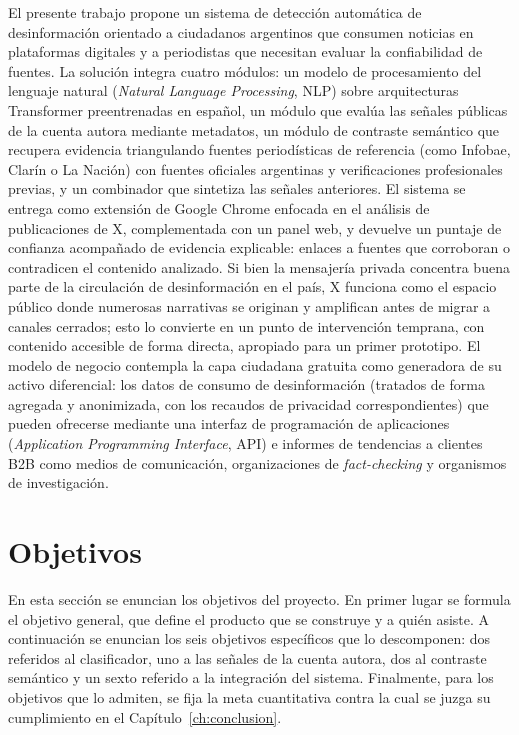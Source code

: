 El presente trabajo propone un sistema de detección automática de desinformación orientado a ciudadanos argentinos que consumen noticias en plataformas digitales y a periodistas que necesitan evaluar la confiabilidad de fuentes. La solución integra cuatro módulos: un modelo de procesamiento del lenguaje natural (\textit{Natural Language Processing}, NLP) sobre arquitecturas Transformer preentrenadas en español, un módulo que evalúa las señales públicas de la cuenta autora mediante metadatos, un módulo de contraste semántico que recupera evidencia triangulando fuentes periodísticas de referencia (como Infobae, Clarín o La Nación) con fuentes oficiales argentinas y verificaciones profesionales previas, y un combinador que sintetiza las señales anteriores. El sistema se entrega como extensión de Google Chrome enfocada en el análisis de publicaciones de X, complementada con un panel web, y devuelve un puntaje de confianza acompañado de evidencia explicable: enlaces a fuentes que corroboran o contradicen el contenido analizado. Si bien la mensajería privada concentra buena parte de la circulación de desinformación en el país, X funciona como el espacio público donde numerosas narrativas se originan y amplifican antes de migrar a canales cerrados; esto lo convierte en un punto de intervención temprana, con contenido accesible de forma directa, apropiado para un primer prototipo. El modelo de negocio contempla la capa ciudadana gratuita como generadora de su activo diferencial: los datos de consumo de desinformación (tratados de forma agregada y anonimizada, con los recaudos de privacidad correspondientes) que pueden ofrecerse mediante una interfaz de programación de aplicaciones (\textit{Application Programming Interface}, API) e informes de tendencias a clientes B2B como medios de comunicación, organizaciones de \textit{fact-checking} y organismos de investigación.

\section{Objetivos}

En esta sección se enuncian los objetivos del proyecto. En primer lugar se formula el objetivo general, que define el producto que se construye y a quién asiste. A continuación se enuncian los seis objetivos específicos que lo descomponen: dos referidos al clasificador, uno a las señales de la cuenta autora, dos al contraste semántico y un sexto referido a la integración del sistema. Finalmente, para los objetivos que lo admiten, se fija la meta cuantitativa contra la cual se juzga su cumplimiento en el Capítulo~\ref{ch:conclusion}.

